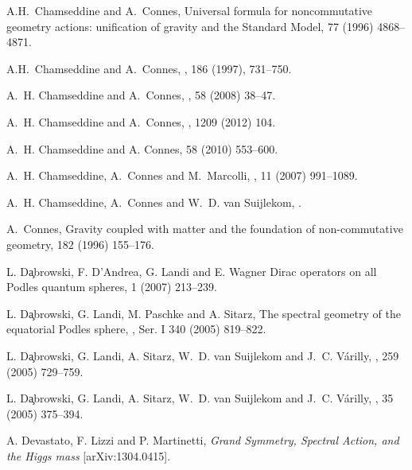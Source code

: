 \documentclass[preprint]{revtex4}
\begin{document}
\begin{thebibliography}{99}

  A.H.~Chamseddine and A.~Connes,  
\newblock Universal formula for noncommutative geometry actions: unification of gravity
and the Standard Model,
 77 (1996) 4868--4871.

 A.H.~Chamseddine and  A.~Connes,
, 
 186 (1997), 731--750.

A.~H. Chamseddine and A.~Connes,
,
 58 (2008)  38--47.

  A.~H. Chamseddine and A.~Connes,
,
 1209 (2012) 104.

A.~H. Chamseddine and A. Connes,
 58 (2010) 553--600.

A.~H. Chamseddine, A.~Connes and M.~Marcolli,
,
 11 (2007) 991--1089.

A.~H. Chamseddine, A.~Connes and W.~D. van Suijlekom,
.

A.~Connes,
\newblock Gravity coupled with matter and the foundation of non-commutative
  geometry, 
 182 (1996) 155--176.

L. D\c{a}browski, F. D'Andrea, G. Landi and E. Wagner
Dirac operators on all Podles quantum spheres,
 1 (2007) 213--239.

L. D\c{a}browski, G. Landi, M. Paschke and A. Sitarz,
\newblock The spectral geometry of the equatorial Podles sphere,
, Ser. I 340 (2005) 819--822.

L. D\c{a}browski, G. Landi, A. Sitarz, W.~D. van Suijlekom and J.~C. V\'arilly,
,
 259 (2005) 729--759.

L. D\c{a}browski, G. Landi, A. Sitarz, W.~D. van Suijlekom and J.~C. V\'arilly,
,
 35 (2005) 375--394.

A. Devastato, F. Lizzi and P. Martinetti,
{\em Grand Symmetry, Spectral Action, and the Higgs mass} [arXiv:1304.0415].

\end{thebibliography}
\end{document}
